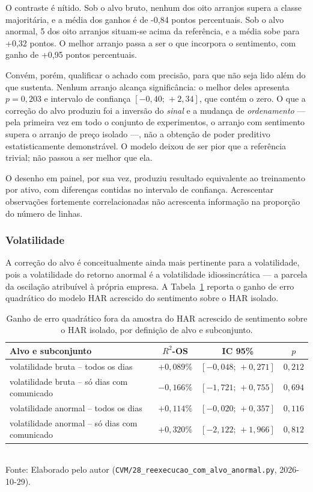 O contraste é nítido. Sob o alvo bruto, nenhum dos oito arranjos supera a classe majoritária, e a
média dos ganhos é de -0{,}84 pontos percentuais. Sob o alvo anormal, 5 dos oito arranjos
situam-se acima da referência, e a média sobe para +0{,}32 pontos. O melhor arranjo passa a ser o
que incorpora o sentimento, com ganho de +0{,}95 pontos percentuais.

Convém, porém, qualificar o achado com precisão, para que não seja lido além do que sustenta.
Nenhum arranjo alcança significância: o melhor deles apresenta $p = 0{,}203$ e intervalo de
confiança $[-0{,}40; \, +2{,}34]$, que contém o zero. O que a correção do alvo produziu foi a
inversão do \emph{sinal} e a mudança de \emph{ordenamento} --- pela primeira vez em todo o conjunto
de experimentos, o arranjo com sentimento supera o arranjo de preço isolado ---, não a obtenção de
poder preditivo estatisticamente demonstrável. O modelo deixou de ser pior que a referência trivial;
não passou a ser melhor que ela.

O desenho em painel, por sua vez, produziu resultado equivalente ao treinamento por ativo, com
diferenças contidas no intervalo de confiança. Acrescentar observações fortemente correlacionadas
não acrescenta informação na proporção do número de linhas.

\subsubsection{Volatilidade}

A correção do alvo é conceitualmente ainda mais pertinente para a volatilidade, pois a volatilidade
do retorno anormal é a volatilidade idiossincrática --- a parcela da oscilação atribuível à própria
empresa. A Tabela~\ref{tab:alvo_vol} reporta o ganho de erro quadrático do modelo HAR acrescido do
sentimento sobre o HAR isolado.

\begin{table}[htpb]
\centering
\caption{Ganho de erro quadrático fora da amostra do HAR acrescido de sentimento sobre o HAR isolado, por definição de alvo e subconjunto.}
\label{tab:alvo_vol}
\begin{tabular}{l c c c}
\hline
\textbf{Alvo e subconjunto} & \textbf{$R^2$-OS} & \textbf{IC 95\%} & \textbf{$p$} \\ \hline
volatilidade bruta -- todos os dias & $+0{,}089\%$ & $[-0{,}048;\,+0{,}271]$ & $0{,}212$ \\
volatilidade bruta -- só dias com comunicado & $-0{,}166\%$ & $[-1{,}721;\,+0{,}755]$ & $0{,}694$ \\
volatilidade anormal -- todos os dias & $+0{,}114\%$ & $[-0{,}020;\,+0{,}357]$ & $0{,}116$ \\
volatilidade anormal -- só dias com comunicado & $+0{,}320\%$ & $[-2{,}122;\,+1{,}966]$ & $0{,}812$ \\
\hline
\end{tabular}
\vspace{0.2cm}
{\small \\ Fonte: Elaborado pelo autor (\texttt{CVM/28\_reexecucao\_com\_alvo\_anormal.py}, 2026-10-29).}
\end{table}

